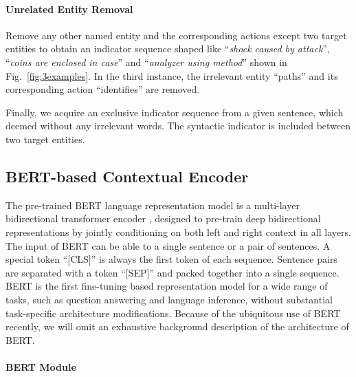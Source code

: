 \documentclass[conference]{IEEEtran}
\begin{document}
\paragraph{Unrelated Entity Removal}
Remove any other named entity and the corresponding actions except two target entities to obtain an indicator sequence shaped like “{\em shock caused by attack}”, “{\em coins are enclosed in case}” and “{\em analyzer using method}” shown in Fig.~\ref{fig:3examples}. In the third instance, the irrelevant entity “paths” and its corresponding action “identifies” are removed. 

Finally, we acquire an exclusive indicator sequence from a given sentence, which deemed without any irrelevant words. The syntactic indicator is included between two target entities. 

\subsection{BERT-based Contextual Encoder}

The pre-trained BERT language representation model \cite{devlin2019bert} is a multi-layer bidirectional transformer encoder \cite{vaswani2017attention}, designed to pre-train deep bidirectional representations by jointly conditioning on both left and right context in all layers. The input of BERT can be able to a single sentence or a pair of sentences. A special token “[CLS]” is always the first token of each sequence. Sentence pairs are separated with a token “[SEP]” and packed together into a single sequence. BERT is the first fine-tuning based representation model for a wide range of tasks, such as question answering and language inference, without substantial task-specific architecture modifications. Because of the ubiquitous use of BERT recently, we will omit an exhaustive background description of the architecture of BERT. 

\paragraph{BERT Module}
\end{document}
